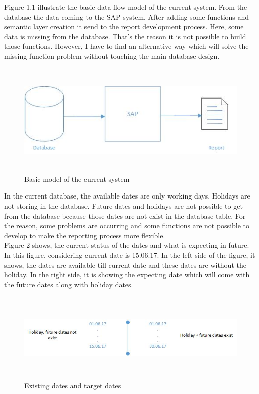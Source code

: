 Figure 1.1 illustrate the basic data flow model of the current system. From the database the data coming to the SAP system. After adding some functions and semantic layer creation it send to the report development process. Here, some data is missing from the database. That's the reason it is not possible to build those functions. However, I have to find an alternative way which will solve the missing function problem without touching the main database design.\\
\begin{figure}[!ht]
	\centering
		\includegraphics[width=pt, height=155pt, width=1.0\textwidth]{images/1.jpg}
	\caption{Basic model of the current system}
	\label{fig:1}
\end{figure}

In the current database, the available dates are only working days. Holidays are not storing in the database. Future dates and holidays are not possible to get from the database because those dates are not exist in the database table.  For the reason, some problems are occurring and some functions are not possible to develop to make the reporting process more flexible. \\

Figure 2 shows, the current status of the dates and what is expecting in future. In this figure, considering current date is 15.06.17. In the left side of the figure, it shows, the dates are available till current date and these dates are without the holiday. In the right side, it is showing the expecting date which will come with the future dates along with holiday dates.\\
\begin{figure}[!ht]
	\centering
		\includegraphics[width=pt, height=122pt, width=1.0\textwidth]{images/2.jpg}
	\caption{Existing dates and target dates}
	\label{fig:2}
\end{figure}

